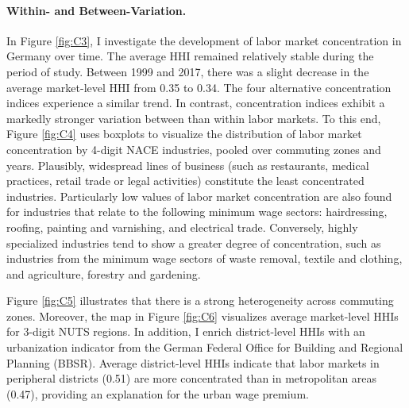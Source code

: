 \documentclass[11pt,oneside,reqno,xcolor=dvipsnames]{article} %
\begin{document}
\paragraph{Within- and Between-Variation.} In Figure \ref{fig:C3}, I investigate the development of labor market concentration in Germany over time. The average HHI remained relatively stable during the period of study. Between 1999 and 2017, there was a slight decrease in the average market-level HHI from 0.35 to 0.34. The four alternative concentration indices experience a similar trend. In contrast, concentration indices exhibit a markedly stronger variation between than within labor markets. To this end, Figure \ref{fig:C4} uses boxplots to visualize the distribution of labor market concentration by 4-digit NACE industries, pooled over commuting zones and years. Plausibly, widespread lines of business (such as restaurants, medical practices, retail trade or legal activities) constitute the least concentrated industries. Particularly low values of labor market concentration are also found for industries that relate to the following minimum wage sectors: hairdressing, roofing, painting and varnishing, and electrical trade. Conversely, highly specialized industries tend to show a greater degree of concentration, such as industries from the minimum wage sectors of waste removal, textile and clothing, and agriculture, forestry and gardening.

Figure \ref{fig:C5} illustrates that there is a strong heterogeneity across commuting zones. Moreover, the map in Figure \ref{fig:C6} visualizes average market-level HHIs for 3-digit NUTS regions. In addition, I enrich district-level HHIs with an urbanization indicator from the German Federal Office for Building and Regional Planning (BBSR). Average district-level HHIs indicate that labor markets in peripheral districts (0.51) are more concentrated than in metropolitan areas (0.47), providing an explanation for the urban wage premium.

\end{document}
